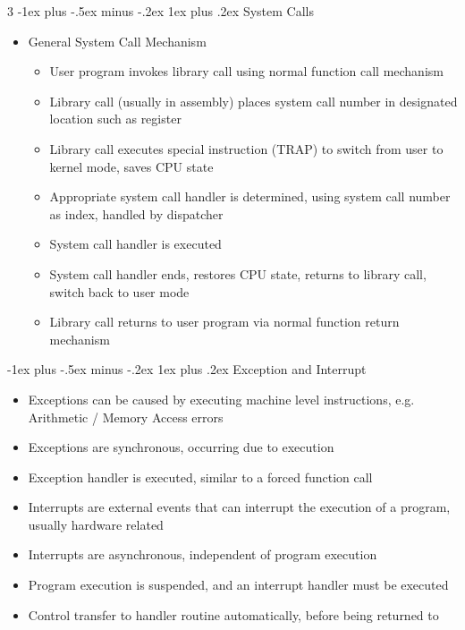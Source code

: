 \documentclass[10pt, landscape]{article}
\makeatletter
\renewcommand{\subsection}{\@startsection{subsection}{3}{0mm}%
                                {-1ex plus -.5ex minus -.2ex}%
                                {1ex plus .2ex}%
                                {\normalfont\small\bfseries}}%
\makeatother
\begin{document}
\begin{multicols*}{3}
\subsection{System Calls}
\begin{itemize}
    \item General System Call Mechanism
    \begin{itemize}
        \item User program invokes library call using normal function call mechanism
        \item Library call (usually in assembly) places system call number in designated location such as register
        \item Library call executes special instruction (TRAP) to switch from user to kernel mode, saves CPU state
        \item Appropriate system call handler is determined, using system call number as index, handled by dispatcher
        \item System call handler is executed
        \item System call handler ends, restores CPU state, returns to library call, switch back to user mode
        \item Library call returns to user program via normal function return mechanism
    \end{itemize}
\end{itemize}

\subsection{Exception and Interrupt}
\begin{itemize}
    \item Exceptions can be caused by executing machine level instructions, e.g. Arithmetic / Memory Access errors
    \item Exceptions are synchronous, occurring due to execution
    \item Exception handler is executed, similar to a forced function call
    \item Interrupts are external events that can interrupt the execution of a program, usually hardware related
    \item Interrupts are asynchronous, independent of program execution
    \item Program execution is suspended, and an interrupt handler must be executed
    \item Control transfer to handler routine automatically, before being returned to
\end{itemize}


\end{multicols*}
\end{document}

